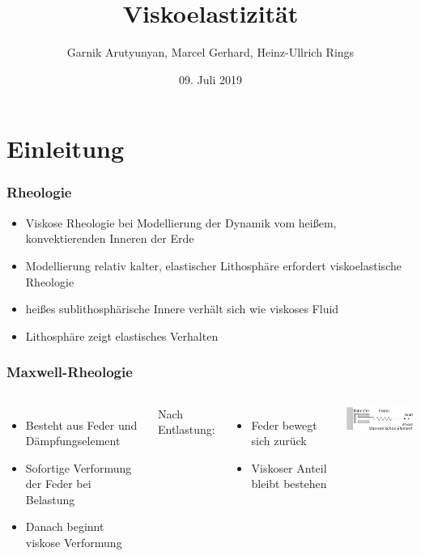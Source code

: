 \documentclass{beamer}
\author{Garnik Arutyunyan, Marcel Gerhard, Heinz-Ullrich Rings}
\title[Modellierungspraktikum]{Viskoelastizität}
\institute{Johannes-Gutenberg Universität Mainz}
\date{09. Juli 2019}
\begin{document}
 
 
 \begin{frame}
 \titlepage
 \end{frame}
 
 \begin{frame}
 	\tableofcontents
 \end{frame}
% 
\section{Einleitung}
\begin{frame}
\frametitle{Rheologie}
\begin{itemize}
	\item Viskose Rheologie bei Modellierung der Dynamik vom heißem, konvektierenden Inneren der Erde
	\item Modellierung relativ kalter, elastischer Lithosphäre erfordert viskoelastische Rheologie
	\item heißes sublithosphärische Innere verhält sich wie viskoses Fluid
	\item Lithosphäre zeigt elastisches Verhalten  
\end{itemize}
	
\end{frame}
	
\begin{frame}
\frametitle{Maxwell-Rheologie}
 \begin{columns}
 \begin{itemize}
 	\item Besteht aus Feder und Dämpfungselement
 	\item Sofortige Verformung der Feder bei Belastung
 	\item Danach beginnt viskose Verformung
 \end{itemize}
Nach Entlastung:
\begin{itemize}
	\item Feder bewegt sich zurück
	\item Viskoser Anteil bleibt bestehen
\end{itemize}
\includegraphics[scale=1]{images.jpg}
\end{columns}
\end{frame}
	
\end{document}
